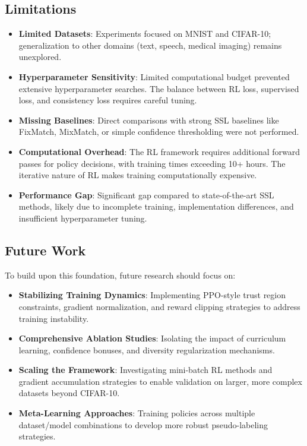 \documentclass[pdflatex,sn-mathphys-num]{sn-jnl}%
\theoremstyle{thmstyleone}%
\theoremstyle{thmstyletwo}%
\theoremstyle{thmstylethree}%
\begin{document}
\subsection{Limitations}
\begin{itemize}
    \item \textbf{Limited Datasets}: Experiments focused on MNIST and CIFAR-10; generalization to other domains (text, speech, medical imaging) remains unexplored.
    \item \textbf{Hyperparameter Sensitivity}: Limited computational budget prevented extensive hyperparameter searches. The balance between RL loss, supervised loss, and consistency loss requires careful tuning.
    \item \textbf{Missing Baselines}: Direct comparisons with strong SSL baselines like FixMatch, MixMatch, or simple confidence thresholding were not performed.
    \item \textbf{Computational Overhead}: The RL framework requires additional forward passes for policy decisions, with training times exceeding 10+ hours. The iterative nature of RL makes training computationally expensive.
    \item \textbf{Performance Gap}: Significant gap compared to state-of-the-art SSL methods, likely due to incomplete training, implementation differences, and insufficient hyperparameter tuning.
\end{itemize}

\subsection{Future Work}
To build upon this foundation, future research should focus on:
\begin{itemize}
    \item \textbf{Stabilizing Training Dynamics}: Implementing PPO-style trust region constraints, gradient normalization, and reward clipping strategies to address training instability.
    \item \textbf{Comprehensive Ablation Studies}: Isolating the impact of curriculum learning, confidence bonuses, and diversity regularization mechanisms.
    \item \textbf{Scaling the Framework}: Investigating mini-batch RL methods and gradient accumulation strategies to enable validation on larger, more complex datasets beyond CIFAR-10.
    \item \textbf{Meta-Learning Approaches}: Training policies across multiple dataset/model combinations to develop more robust pseudo-labeling strategies.
\end{itemize}


\end{document}
